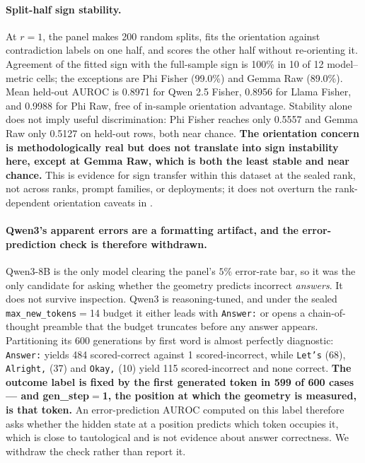 \documentclass[10pt, letterpaper]{article}
\newcommand{\auroc}{\text{AUROC}}
\begin{document}
\paragraph{Split-half sign stability.}
At $r=1$, the panel makes 200 random splits, fits the orientation
against contradiction labels on one half, and scores the other half
without re-orienting it. Agreement of the fitted sign with the
full-sample sign is 100\% in 10 of 12 model--metric cells; the
exceptions are Phi Fisher (99.0\%) and Gemma Raw (89.0\%). Mean
held-out $\auroc$ is 0.8971 for Qwen 2.5 Fisher, 0.8956 for Llama
Fisher, and 0.9988 for Phi Raw, free of in-sample orientation
advantage. Stability alone does not imply useful discrimination:
Phi Fisher reaches only 0.5557 and Gemma Raw only 0.5127 on held-out
rows, both near chance. \textbf{The orientation concern is
methodologically real but does not translate into sign instability
here, except at Gemma Raw, which is both the least stable and near
chance.} This is evidence for sign transfer within this dataset at
the sealed rank, not across ranks, prompt families, or deployments;
it does not overturn the rank-dependent orientation caveats in
.

\paragraph{Qwen3's apparent errors are a formatting artifact, and the
error-prediction check is therefore withdrawn.}
Qwen3-8B is the only model clearing the panel's $5\%$ error-rate bar,
so it was the only candidate for asking whether the geometry predicts
incorrect \emph{answers}. It does not survive inspection.
Qwen3 is reasoning-tuned, and under the sealed
\texttt{max\_new\_tokens}$=$14 budget it either leads with
\texttt{Answer:} or opens a chain-of-thought preamble that the budget
truncates before any answer appears. Partitioning its 600 generations
by first word is almost perfectly diagnostic: \texttt{Answer:} yields
484 scored-correct against 1 scored-incorrect, while
\texttt{Let's} (68), \texttt{Alright,} (37) and \texttt{Okay,} (10)
yield 115 scored-incorrect and none correct. \textbf{The outcome label
is fixed by the first generated token in 599 of 600 cases --- and
gen\_step$=$1, the position at which the geometry is measured, is that
token.} An error-prediction $\auroc$ computed on this label therefore
asks whether the hidden state at a position predicts which token
occupies it, which is close to tautological and is not evidence about
answer correctness. We withdraw the check rather than report it.
\end{document}
